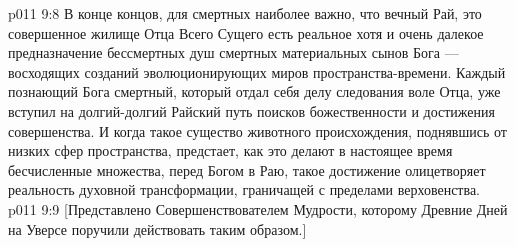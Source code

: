 \vs p011 9:8 \pc В конце концов, для смертных наиболее важно, что вечный Рай, это совершенное жилище Отца Всего Сущего есть реальное хотя и очень далекое предназначение бессмертных душ смертных материальных сынов Бога --- восходящих созданий эволюционирующих миров пространства\hyp{}времени. Каждый познающий Бога смертный, который отдал себя делу следования воле Отца, уже вступил на долгий\hyp{}долгий Райский путь поисков божественности и достижения совершенства. И когда такое существо животного происхождения, поднявшись от низких сфер пространства, предстает, как это делают в настоящее время бесчисленные множества, перед Богом в Раю, такое достижение олицетворяет реальность духовной трансформации, граничащей с пределами верховенства.
\vsetoff
\vs p011 9:9 [Представлено Совершенствователем Мудрости, которому Древние Дней на Уверсе поручили действовать таким образом.]
